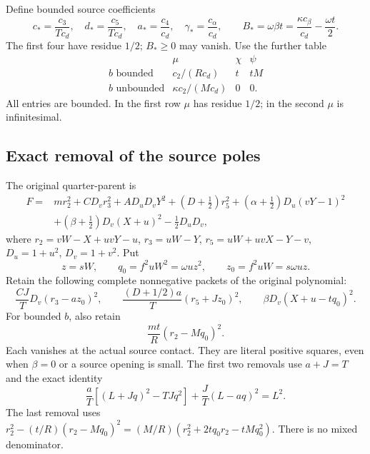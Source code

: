 Define bounded source coefficients
\[
 c_*=\frac{c_3}{Tc_d},\quad d_*=\frac{c_5}{Tc_d},\quad
 a_*=\frac{c_4}{c_d},\quad \gamma_*=\frac{c_\alpha}{c_d},
 \qquad B_*=\omega\beta t
              =\frac{\kappa c_\beta}{c_d}-\frac{\omega t}{2}.
                                                               \tag{EZ4}
\]
The first four have residue $1/2$; $B_*\geq0$ may vanish.
Use the further table
\[
\begin{array}{c|ccc}
 &\mu&\chi&\psi\\ \hline
 b\text{ bounded}&c_2/(Rc_d)&t&tM\\
 b\text{ unbounded}&\kappa c_2/(Mc_d)&0&0 .
\end{array}                                                     \tag{EZ5}
\]
All entries are bounded. In the first row $\mu$ has residue
$1/2$; in the second $\mu$ is infinitesimal.

\subsection{Exact removal of the source poles}

The original quarter-parent is
\[
\begin{split}
 F={}&mr_2^2+CD_vr_3^2+AD_uD_vY^2
 +(D+\tfrac12)r_5^2+(\alpha+\tfrac12)D_u(vY-1)^2\\
 &+(\beta+\tfrac12)D_v(X+u)^2-\tfrac12D_uD_v,
\end{split}                                                     \tag{EZ6}
\]
where $r_2=vW-X+uvY-u$, $r_3=uW-Y$,
$r_5=uW+uvX-Y-v$, $D_u=1+u^2$, $D_v=1+v^2$.
Put
\[
 z=sW,\qquad q_0=f^2uW^2=\omega uz^2,\qquad
 z_0=f^2uW=s\omega uz.
\]
Retain the following complete nonnegative packets of the original
polynomial:
\[
 \frac{CJ}{T}D_v(r_3-az_0)^2,\qquad
 \frac{(D+1/2)a}{T}(r_5+Jz_0)^2,\qquad
 \beta D_v(X+u-tq_0)^2.                                        \tag{EZ7}
\]
For bounded $b$, also retain
\[
                       \frac{mt}{R}(r_2-Mq_0)^2.              \tag{EZ8}
\]
Each vanishes at the actual source contact. They are literal
positive squares, even when $\beta=0$ or a source opening is small.
The first two removals use $a+J=T$ and the exact identity
\[
 \frac aT[(L+Jq)^2-TJq^2]+\frac JT(L-aq)^2=L^2.
\]
The last removal uses
$r_2^2-(t/R)(r_2-Mq_0)^2
=(M/R)(r_2^2+2tq_0r_2-tMq_0^2)$.
There is no mixed denominator.

